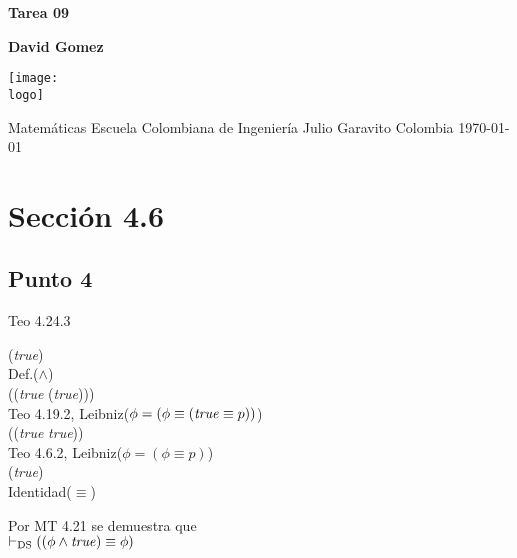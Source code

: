 \documentclass{article}
\newcommand{\logo}{C:/Users/usuario/Documents/U/logo-eci.jpg}
\newcommand{\titlename}{Tarea 09}%
\renewcommand{\author}{David Gomez}%
\begin{document}
\begin{titlepage}
    \begin{center}
        \vspace*{1cm}

        \textbf{\Huge{\titlename}}

        \vspace{1.5cm}

        \textbf{\large{\author}
}
        \vspace{4cm}

        \texttt{[image: \\logo]}

        \vspace{4cm}

        Matemáticas\linebreak
        Escuela Colombiana de Ingeniería Julio Garavito\linebreak
        Colombia\linebreak
        \today

    \end{center}
\end{titlepage}
\clearpage
\tableofcontents
\clearpage

\section{Sección 4.6}
\subsection{Punto 4}
\begin{logicenv}{Teo 4.24.3}
    \begin{derivation}
            (\phi \land \textrm{\textit{true}})\\
        Def.($\land$)\\
            (\phi \equiv (\textrm{\textit{true}} \equiv (\phi \lor \textrm{\textit{true}})))\\
        Teo 4.19.2, Leibniz($\phi = (\phi \equiv (\textrm{\textit{true}} \equiv p))$)\\
            (\phi \equiv (\textrm{\textit{true}} \equiv \textrm{\textit{true}}))\\
        Teo 4.6.2, Leibniz($\phi = (\phi \equiv p)$)\\
            (\phi \equiv \textrm{\textit{true}})\\
        Identidad($\equiv$)\\
            \phi
    \end{derivation}
    Por MT 4.21 se demuestra que\\
    $\vdash_{\text{DS}} ((\phi \land \textrm{\textit{true}}) \equiv \phi)$
\end{logicenv}
\end{document}
